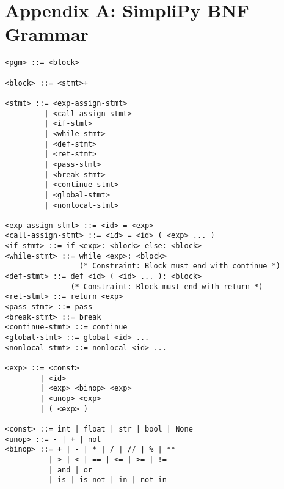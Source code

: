 \documentclass[runningheads]{llncs}
\begin{document}
\section*{Appendix A: SimpliPy BNF Grammar}

\begin{verbatim}
<pgm> ::= <block>

<block> ::= <stmt>+

<stmt> ::= <exp-assign-stmt>
         | <call-assign-stmt>
         | <if-stmt>
         | <while-stmt>
         | <def-stmt>
         | <ret-stmt>
         | <pass-stmt>
         | <break-stmt>
         | <continue-stmt>
         | <global-stmt>
         | <nonlocal-stmt>

<exp-assign-stmt> ::= <id> = <exp>
<call-assign-stmt> ::= <id> = <id> ( <exp> ... )
<if-stmt> ::= if <exp>: <block> else: <block>
<while-stmt> ::= while <exp>: <block>
                 (* Constraint: Block must end with continue *)
<def-stmt> ::= def <id> ( <id> ... ): <block>
               (* Constraint: Block must end with return *)
<ret-stmt> ::= return <exp>
<pass-stmt> ::= pass
<break-stmt> ::= break
<continue-stmt> ::= continue
<global-stmt> ::= global <id> ...
<nonlocal-stmt> ::= nonlocal <id> ...

<exp> ::= <const>
        | <id>
        | <exp> <binop> <exp>
        | <unop> <exp>
        | ( <exp> )

<const> ::= int | float | str | bool | None
<unop> ::= - | + | not
<binop> ::= + | - | * | / | // | % | **
          | > | < | == | <= | >= | !=
          | and | or
          | is | is not | in | not in
\end{verbatim}
\end{document}
